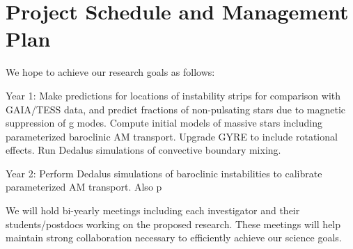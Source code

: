 \section{Project Schedule and Management Plan}

We hope to achieve our research goals as follows:

Year 1: Make predictions for locations of instability strips for comparison with GAIA/TESS data, and predict fractions of non-pulsating stars due to magnetic suppression of g modes. Compute initial models of massive stars including parameterized baroclinic AM transport. Upgrade GYRE to include rotational effects. Run Dedalus simulations of convective boundary mixing.

Year 2: Perform Dedalus simulations of baroclinic instabilities to calibrate parameterized AM transport. Also p

We will  hold bi-yearly meetings including each investigator and their students/postdocs working on the proposed research. These meetings will help maintain strong collaboration necessary to efficiently achieve our science goals.
